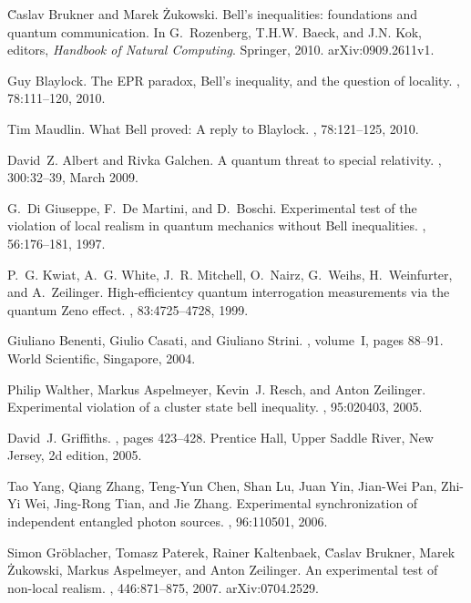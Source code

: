 \documentclass[12pt]{article} %
\begin{document}
\begin{thebibliography}{10}
{\u C}aslav Brukner and Marek \.Zukowski.
\newblock Bell's inequalities: foundations and quantum communication.
\newblock In G.~Rozenberg, T.H.W. Baeck, and J.N. Kok, editors, {\em Handbook
  of Natural Computing}. Springer, 2010.
\newblock arXiv:0909.2611v1.

Guy Blaylock.
\newblock The {E}{P}{R} paradox, {B}ell's inequality, and the question of
  locality.
, 78:111--120, 2010.

Tim Maudlin.
\newblock What {B}ell proved: {A} reply to {B}laylock.
, 78:121--125, 2010.

David~Z. Albert and Rivka Galchen.
\newblock A quantum threat to special relativity.
, 300:32--39, March 2009.

G.~{Di Giuseppe}, F.~{De Martini}, and D.~Boschi.
\newblock Experimental test of the violation of local realism in quantum
  mechanics without {B}ell inequalities.
, 56:176--181, 1997.

P.~G. Kwiat, A.~G. White, J.~R. Mitchell, O.~Nairz, G.~Weihs, H.~Weinfurter,
  and A.~Zeilinger.
\newblock High-efficientcy quantum interrogation measurements via the quantum
  {Z}eno effect.
, 83:4725--4728, 1999.

Giuliano Benenti, Giulio Casati, and Giuliano Strini.
, volume~I,
  pages 88--91.
\newblock World Scientific, Singapore, 2004.

Philip Walther, Markus Aspelmeyer, Kevin~J. Resch, and Anton Zeilinger.
\newblock Experimental violation of a cluster state bell inequality.
, 95:020403, 2005.

David~J. Griffiths.
, pages 423--428.
\newblock Prentice Hall, Upper Saddle River, New Jersey, 2d edition, 2005.

Tao Yang, Qiang Zhang, Teng-Yun Chen, Shan Lu, Juan Yin, Jian-Wei Pan, Zhi-Yi
  Wei, Jing-Rong Tian, and Jie Zhang.
\newblock Experimental synchronization of independent entangled photon sources.
, 96:110501, 2006.

Simon Gr{\"o}blacher, Tomasz Paterek, Rainer Kaltenbaek, {\u C}aslav Brukner,
  Marek {\.Z}ukowski, Markus Aspelmeyer, and Anton Zeilinger.
\newblock An experimental test of non-local realism.
, 446:871--875, 2007.
\newblock arXiv:0704.2529.


\end{thebibliography}
\end{document}

